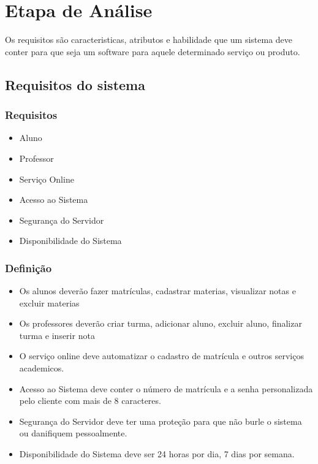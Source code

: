 

\chapter{Etapa de An\'{a}lise}
Os requisitos são caracteristicas, atributos e habilidade que um sistema deve conter para que seja um software
para aquele determinado serviço ou produto.
 \section{Requisitos do sistema}
 \subsection{Requisitos}
  \begin{itemize}
      \item Aluno
      \item Professor
      \item Serviço Online
      \item Acesso ao Sistema
      \item Segurança do Servidor
      \item Disponibilidade do Sistema
  \end{itemize}
  
  \subsection{Definição}
  \begin{itemize}
      \item Os alunos deverão fazer matrículas, cadastrar materias, visualizar notas e excluir materias
      \item Os professores deverão criar turma, adicionar aluno, excluir aluno, finalizar turma e inserir nota
      \item O serviço online deve automatizar o cadastro de matrícula e outros serviços academicos.
      \item Acesso ao Sistema deve conter o número de matrícula e a senha personalizada pelo cliente com mais de 8 caracteres.	
      \item Segurança do Servidor deve ter uma proteção para que não burle o sistema ou danifiquem pessoalmente. 
      \item Disponibilidade do Sistema  deve ser 24 horas por dia, 7 dias por semana.
  \end{itemize}
   

  